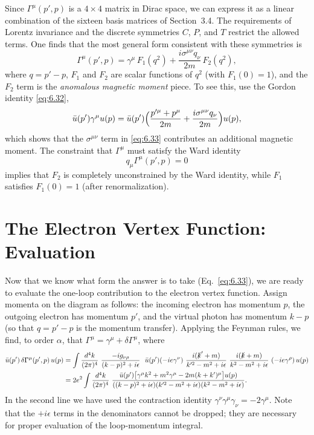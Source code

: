 Since $\Gamma^\mu(p',p)$ is a $4\times4$ matrix in Dirac space, we can express
it as a linear combination of the sixteen basis matrices of Section~3.4.  The
requirements of Lorentz invariance and the discrete symmetries $C$, $P$, and
$T$ restrict the allowed terms.  One finds that the most general form
consistent with these symmetries is
\begin{equation}
  \Gamma^\mu(p',p) = \gamma^\mu\,F_1(q^2)
    + \frac{i\sigma^{\mu\nu}q_\nu}{2m}\,F_2(q^2),
  \label{eq:6.33}
\end{equation}
where $q = p'-p$, $F_1$ and $F_2$ are scalar functions of $q^2$ (with
$F_1(0) = 1$), and the $F_2$ term is the \emph{anomalous magnetic moment}
piece.  To see this, use the Gordon identity
\eqref{eq:6.32},
\begin{equation}
  \bar{u}(p')\gamma^\mu u(p) = \bar{u}(p')\Bigl(
    \frac{p'^{\mu}+p^{\mu}}{2m} + \frac{i\sigma^{\mu\nu}q_\nu}{2m} \Bigr)u(p),
  \label{eq:6.32}
\end{equation}
which shows that the $\sigma^{\mu\nu}$ term in \eqref{eq:6.33} contributes an
additional magnetic moment.  The constraint that $\Gamma^\mu$ must satisfy the
Ward identity
\begin{equation}
  q_\mu\Gamma^\mu(p',p) = 0
\end{equation}
implies that $F_2$ is completely unconstrained by the Ward identity, while
$F_1$ satisfies $F_1(0) = 1$ (after renormalization).

\section{The Electron Vertex Function: Evaluation}

Now that we know what form the answer is to take (Eq.~\eqref{eq:6.33}), we are
ready to evaluate the one-loop contribution to the electron vertex function.
Assign momenta on the diagram as follows: the incoming electron has momentum
$p$, the outgoing electron has momentum $p'$, and the virtual photon has
momentum $k-p$ (so that $q = p'-p$ is the momentum transfer).  Applying the
Feynman rules, we find, to order $\alpha$, that
$\Gamma^\mu = \gamma^\mu + \delta\Gamma^\mu$, where
\begin{equation}
  \begin{aligned}
    \bar{u}(p')\,\delta\Gamma^\mu(p',p)\,u(p)
    &= \int \frac{d^4k}{(2\pi)^4}\
      \frac{-ig_{\nu\rho}}{(k-p)^2+i\epsilon}\ \
      \bar{u}(p')(-ie\gamma^\nu)\
      \frac{i(\slashed{k}'+m)}{k'^2-m^2+i\epsilon}\
      \frac{i(\slashed{k}+m)}{k^2-m^2+i\epsilon}\
      (-ie\gamma^\rho)\,u(p)\\
    &= 2e^2\int \frac{d^4k}{(2\pi)^4}\
      \frac{\bar{u}(p')\bigl[ \gamma^\mu k^2 + m^2\gamma^\mu
        - 2m(k+k')^\mu \bigr]u(p)}
      {((k-p)^2+i\epsilon)(k'^2-m^2+i\epsilon)(k^2-m^2+i\epsilon)} .
  \end{aligned}
  \label{eq:6.38}
\end{equation}
In the second line we have used the contraction identity
$\gamma^\nu\gamma^\mu\gamma_\nu = -2\gamma^\mu$.  Note that the $+i\epsilon$
terms in the denominators cannot be dropped; they are necessary for proper
evaluation of the loop-momentum integral.

